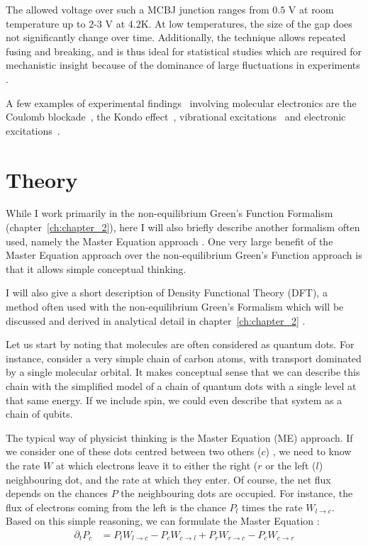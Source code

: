 The allowed voltage over such a MCBJ junction ranges from $0.5$ V at room temperature up to $2$-$3$ V at $4.2$K. At low temperatures, the size of the gap does not significantly change over time. Additionally, the technique allows repeated fusing and breaking, and is thus ideal for statistical studies which are required for mechanistic insight because of the dominance of large fluctuations in experiments \cite{ratnerrev2013}.

A few examples of experimental findings~\cite{koole} involving molecular electronics are the Coulomb blockade~\cite{Park2000, Park2002}, the Kondo effect~\cite{Park2002}, vibrational excitations~\cite{vib1, vib2} and electronic excitations~\cite{elec1}.

\section{Theory}
\label{sec:theoryintro}
While I work primarily in the non-equilibrium Green's Function Formalism (chapter~\ref{ch:chapter_2}), here I will also briefly describe another formalism often used, namely the Master Equation approach \cite{seldenthuis}. One very large benefit of the Master Equation approach over the non-equilibrium Green's Function approach is that it allows simple conceptual thinking.

I will also give a short description of Density Functional Theory (DFT), a method often used with the non-equilibrium Green's Formalism which will be discussed and derived in analytical detail in chapter~\ref{ch:chapter_2}  .

Let us start by noting that molecules are often considered as quantum dots. For instance, consider a very simple chain of carbon atoms, with transport dominated by a single molecular orbital. It makes conceptual sense that we can describe this chain with the simplified model of a chain of quantum dots with a single level at that same energy. If we include spin, we could even describe that system as a chain of qubits.

The typical way of physicist thinking is the Master Equation (ME) approach. If we consider one of these dots centred between two others ($c$) , we need to know the rate $W$ at which electrons leave it to either the right ($r$ or the left ($l$) neighbouring dot, and the rate at which they enter. Of course, the net flux depends on the chances $P$ the neighbouring dots are occupied. For instance, the flux of electrons coming from the left is the chance $P_l$ times the rate $W_{l\rightarrow c}$. Based on this simple reasoning, we can formulate the Master Equation \cite{beenakker}:
\begin{align*}
\partial_t P_c &= P_l W_{l\rightarrow c} - P_c W_{c\rightarrow l} + P_r  W_{r\rightarrow c} - P_c W_{c\rightarrow r}
\end{align*}

